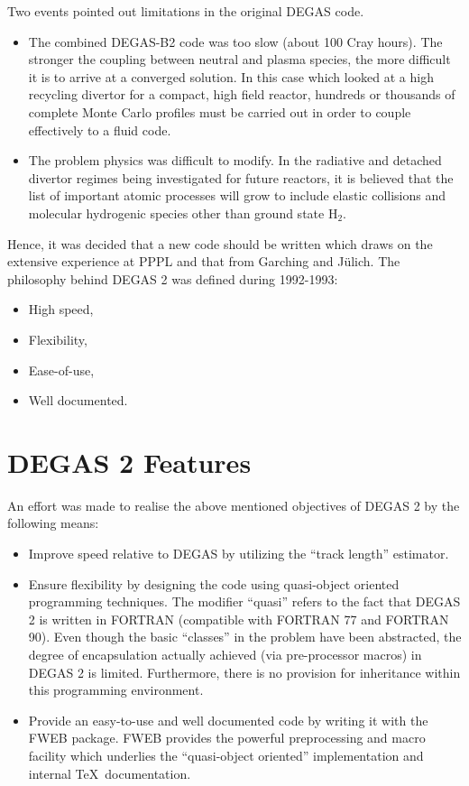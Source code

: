 \documentclass[12pt]{report}
\begin{document}
Two events pointed out limitations in the original DEGAS code\cite{Heif82}.
\begin{itemize}
\item The combined DEGAS-B2 code was too slow 
(about 100 Cray hours)\cite{Stot92}. 
The stronger the coupling between neutral and plasma species, the more 
difficult it is to arrive at a converged solution. In this case which 
looked at a high recycling
divertor for a compact, high field reactor, hundreds or thousands of complete
Monte Carlo profiles must be carried out in order to couple effectively
to a fluid code. 
\item The problem physics was difficult to modify. In the radiative and 
detached divertor
regimes being investigated for future reactors, it is believed that the list
of important atomic processes will grow to include elastic collisions and
molecular hydrogenic species other than ground state H$_{2}$.
\end{itemize}

Hence, it was decided that a new code should be written which draws
on the extensive experience at PPPL and that from Garching and
J\"{u}lich.
The philosophy behind DEGAS 2 was defined during 1992-1993:
\begin{itemize}
\item  High speed, 
\item  Flexibility,
\item  Ease-of-use,
\item  Well documented.
\end{itemize}


\section{DEGAS 2 Features}

An effort was made to realise the above mentioned objectives of
DEGAS 2 by the following means:
\begin{itemize}
\item Improve speed relative to DEGAS by utilizing the 
``track length'' estimator.
\item Ensure flexibility by designing the code using quasi-object oriented
programming techniques. The modifier ``quasi'' refers to the fact that DEGAS 2
is written in FORTRAN (compatible with FORTRAN 77 and FORTRAN 90). Even though
the basic ``classes'' in the problem have been abstracted, the degree of
encapsulation actually achieved (via pre-processor macros) in DEGAS 2 is 
limited. Furthermore, there is no provision for inheritance within this
programming environment.
\item Provide an easy-to-use and well documented code by writing it with the
FWEB\cite{FWEB} package. FWEB provides the powerful preprocessing and
macro facility which underlies the ``quasi-object oriented''  implementation
and internal \TeX\ documentation.
\end{itemize}
\end{document}
